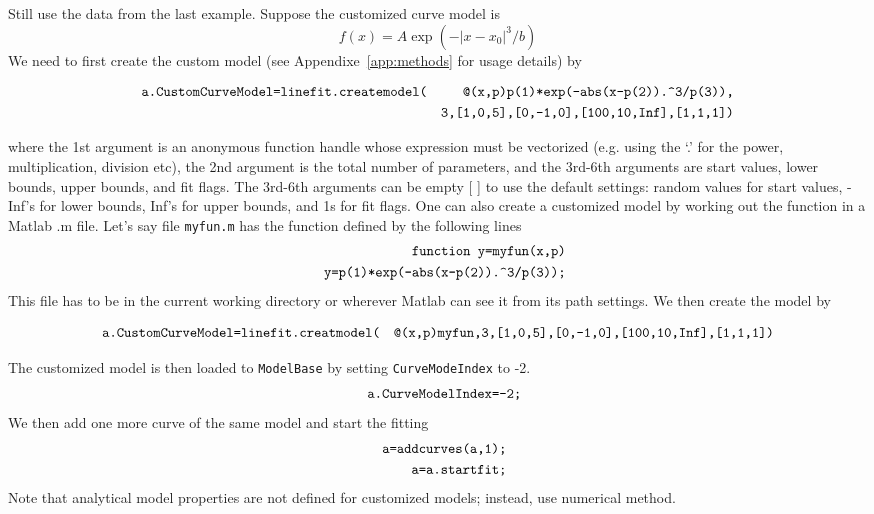 \documentclass[reprint,showpacs,prb,nofootinbib,amsmath,amssymb]{revtex4-1}
\begin{document}
Still use the data from the last example. Suppose the customized curve model is
\begin{equation}
f(x)=A\exp\left(-|x-x_0|^3/b\right) \nonumber
\end{equation}
We need to first create the custom model (see Appendixe~\ref{app:methods} for usage details) by
\begin{widetext}
\begin{eqnarray*}
\verb|a.CustomCurveModel=linefit.createmodel(|&&\verb|@(x,p)p(1)*exp(-abs(x-p(2)).^3/p(3)),| \\
&&\verb|3,[1,0,5],[0,-1,0],[100,10,Inf],[1,1,1])|
\end{eqnarray*}
\end{widetext}
where the 1st argument is an anonymous function handle whose expression must be vectorized (e.g. using the `.' for the power, multiplication, division etc), the 2nd argument is the total number of parameters, and the 3rd-6th arguments are start values, lower bounds, upper bounds, and fit flags. The 3rd-6th arguments can be empty [ ] to use the default settings: random values for start values, -Inf's for lower bounds, Inf's for upper bounds, and 1s for fit flags. One can also create a customized model by working out the function in a Matlab .m file. Let's say file \verb|myfun.m| has the function defined by the following lines 
\begin{eqnarray*}
	&&\verb|function y=myfun(x,p)| \\
	&&\verb|y=p(1)*exp(-abs(x-p(2)).^3/p(3));|
\end{eqnarray*}
This file has to be in the current working directory or wherever Matlab can see it from its path settings. We then create the model by
\begin{widetext}
	\begin{eqnarray*}
		\verb|a.CustomCurveModel=linefit.creatmodel(|&&\verb|@(x,p)myfun,3,[1,0,5],[0,-1,0],[100,10,Inf],[1,1,1])|
	\end{eqnarray*}
\end{widetext}
The customized model is then loaded to \verb|ModelBase| by setting \verb|CurveModeIndex| to -2.
\begin{eqnarray*}
	&&\verb|a.CurveModelIndex=-2;|
\end{eqnarray*}
We then add one more curve of the same model and start the fitting
\begin{eqnarray*}
&&\verb|a=addcurves(a,1);| \\
&&\verb|a=a.startfit;|
\end{eqnarray*}
Note that analytical model properties are not defined for customized models; instead, use numerical method.
\end{document}
